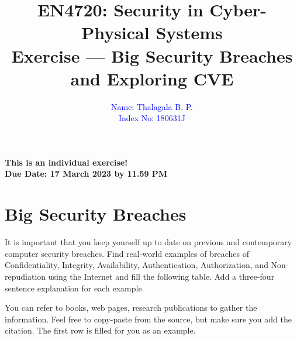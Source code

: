 \documentclass[11pt,letterpaper]{article}
\begin{document}
\title{EN4720: Security in Cyber-Physical Systems \\Exercise --- Big Security Breaches and Exploring CVE}

\author{ \textcolor{blue}{Name: Thalagala B. P.} \\ \textcolor{blue}{Index No: 180631J}}

\maketitle

\begin{center}
	\color{red}\bf This is an individual exercise! \\ Due Date: 17 March 2023 by 11.59 PM
\end{center}

\section*{Big Security Breaches}
%

It is important that you keep yourself up to date on previous and contemporary computer security breaches. Find real-world examples of breaches of Confidentiality, Integrity, Availability, Authentication, Authorization, and Non-repudiation using the Internet and fill the following table. Add a three-four sentence explanation for each example.

You can refer to books, web pages, research publications to gather the information. Feel free to copy-paste from the source, but make sure you add the citation. The first row is filled for you as an example.
\end{document}
